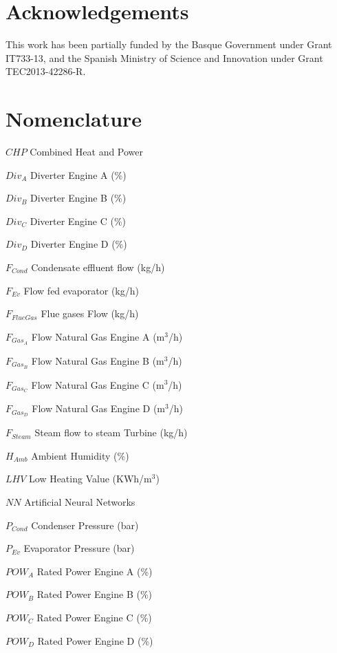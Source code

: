 \documentclass[preprint,12pt,authoryear]{elsarticle}
\begin{document}

\section{Acknowledgements}
This work has been partially funded by the Basque Government under Grant IT733-13, and the Spanish Ministry of Science and Innovation under Grant TEC2013-42286-R.


\section{Nomenclature}

\par $CHP$	Combined Heat and Power
\par $Div_A$	Diverter Engine A (\%)
\par $Div_B$	Diverter Engine B (\%)
\par $Div_C$	Diverter Engine C (\%)
\par $Div_D$	Diverter Engine D (\%)
\par $F_{Cond}$	Condensate effluent flow (kg/h) 
\par $F_{Ev}$	Flow fed evaporator (kg/h) 
\par $F_{FlueGas}$	Flue gases Flow (kg/h) 
\par $F_{Gas_A}$	Flow Natural Gas Engine A (m$^3$/h) 
\par $F_{Gas_B}$	Flow Natural Gas Engine B (m$^3$/h) 
\par $F_{Gas_C}$	Flow Natural Gas Engine C (m$^3$/h) 
\par $F_{Gas_D}$	Flow Natural Gas Engine D (m$^3$/h) 
\par $F_{Steam}$	Steam flow to steam Turbine (kg/h)
\par $H_{Amb}$	Ambient Humidity (\%)
\par $LHV$	Low Heating Value (KWh/m$^3$)
\par $NN$	Artificial Neural Networks 
\par $P_{Cond}$	Condenser Pressure (bar)
\par $P_{Ev}$	Evaporator Pressure (bar) 
\par $POW_A$	Rated Power Engine A (\%) 
\par $POW_B$	Rated Power Engine B (\%) 
\par $POW_C$	Rated Power Engine C (\%) 
\par $POW_D$	Rated Power Engine D (\%) 
\end{document}
